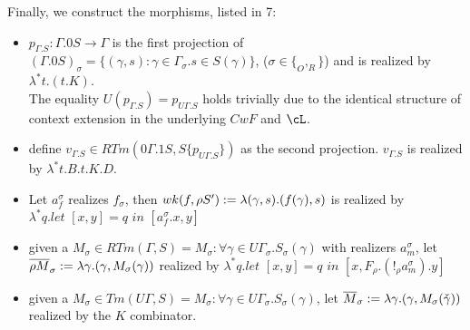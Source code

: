 \documentclass[12pt,a4paper]{article}
\renewcommand{\O}{_{O}}\alwaysmath{O}
\def\R{_{R}}\alwaysmath{R}
\begin{document}
Finally, we construct the morphisms, listed in 7:
\begin{itemize}
  \item $p_{\Gamma.S}: \Gamma. 0 S \to \Gamma$ is the first projection of $(\Gamma. 0 S)_\sigma = \{ (\gamma, s) : \gamma \in \Gamma_\sigma. s \in S(\gamma)\}$, ($\sigma \in \{\O, \R \}$) and is realized by $\lambda^* t. (t.K)$.\\
  The equality $U(p_{\Gamma.S}) = p_{U\Gamma.S}$ holds trivially due to the identical structure of context extension in the underlying $CwF$ and $\cL$.
  
  \item define $v_{\Gamma.S} \in RTm(0\Gamma.1S, S\{p_{U\Gamma.S}\})$ as the second projection. $v_{\Gamma.S}$ is realized by $\lambda^* t. B.t.K.D$.
  
  \item Let $a^\sigma_f$ realizes $f_\sigma$, then $wk(f, \rho S') := \lambda (\gamma, s). (f (\gamma), s)$ is realized by $\lambda^* q. \textit{let }[x, y] = q \textit{ in } [a^\sigma_f . x , y]$
  
  \item given a $M_\sigma \in RTm(\Gamma, S) = M_\sigma : \forall \gamma \in U\Gamma_\sigma. S_\sigma(\gamma)$ with realizers $a^\sigma_m$, let $\overline{\rho M}_\sigma := \lambda \gamma. (\gamma, M_\sigma(\gamma))$ realized by $\lambda^* q. \textit{let }[x, y] = q \textit{ in } [x, F_\rho.(!_\rho a^\sigma_m).y]$   
  
  \item given a $M_\sigma \in Tm(U\Gamma, S) = M_\sigma : \forall \gamma \in U\Gamma_\sigma. S_\sigma(\gamma)$, let $\overline{M}_\sigma := \lambda \gamma. (\gamma, M_\sigma(\check\gamma))$ realized by the $K$ combinator.
\end{itemize}
\end{document}
